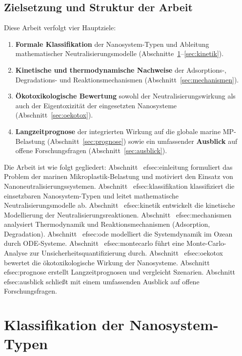 ﻿\documentclass[12pt,a4paper]{article}
\theoremstyle{definition}
\theoremstyle{remark}
\begin{document}
\subsection{Zielsetzung und Struktur der Arbeit}

Diese Arbeit verfolgt vier Hauptziele:
\begin{enumerate}
\item \textbf{Formale Klassifikation} der Nanosystem-Typen und Ableitung
     mathematischer Neutralisierungsmodelle (Abschnitte~\ref{sec:klassifikation}--\ref{sec:kinetik}).
\item \textbf{Kinetische und thermodynamische Nachweise} der Adsorptions-,
     Degradations- und Reaktionsmechanismen (Abschnitt~\ref{sec:mechanismen}).
\item \textbf{Ökotoxikologische Bewertung} sowohl der Neutralisierungswirkung als
     auch der Eigentoxizität der eingesetzten Nanosysteme (Abschnitt~\ref{sec:oekotox}).
\item \textbf{Langzeitprognose} der integrierten Wirkung auf die globale marine
     MP-Belastung (Abschnitt~\ref{sec:prognose}) sowie ein umfassender
     \textbf{Ausblick} auf offene Forschungsfragen (Abschnitt~\ref{sec:ausblick}).
\end{enumerate}

Die Arbeit ist wie folgt gegliedert: Abschnitt~
ef{sec:einleitung} formuliert das Problem der marinen Mikroplastik-Belastung und motiviert den Einsatz von Nanoneutralisierungssystemen. Abschnitt~
ef{sec:klassifikation} klassifiziert die einsetzbaren Nanosystem-Typen und leitet mathematische Neutralisierungsmodelle ab. Abschnitt~
ef{sec:kinetik} entwickelt die kinetische Modellierung der Neutralisierungsreaktionen. Abschnitt~
ef{sec:mechanismen} analysiert Thermodynamik und Reaktionsmechanismen (Adsorption, Degradation). Abschnitt~
ef{sec:ode} modelliert die Systemdynamik im Ozean durch ODE-Systeme. Abschnitt~
ef{sec:montecarlo} führt eine Monte-Carlo-Analyse zur Unsicherheitsquantifizierung durch. Abschnitt~
ef{sec:oekotox} bewertet die ökotoxikologische Wirkung der Nanosysteme. Abschnitt~
ef{sec:prognose} erstellt Langzeitprognosen und vergleicht Szenarien. Abschnitt~
ef{sec:ausblick} schließt mit einem umfassenden Ausblick auf offene Forschungsfragen.

\section{Klassifikation der Nanosystem-Typen}
\label{sec:klassifikation}
\end{document}
